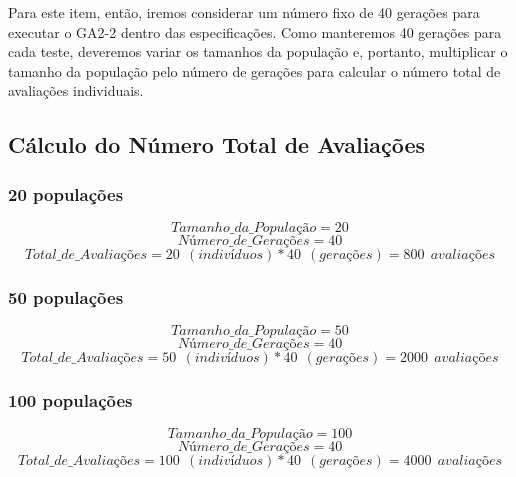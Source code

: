 \documentclass[a4paper, 12pt]{article}
\begin{document}
Para este item, então, iremos considerar um número fixo de 40 gerações para executar o GA2-2 dentro das especificações. Como manteremos 40 gerações para cada teste, deveremos variar os tamanhos da população e, portanto, multiplicar o tamanho da população pelo número de gerações para calcular o número total de avaliações individuais.\\

\subsection{Cálculo do Número Total de Avaliações
}

\subsubsection{20 populações}
\begin{equation*}
    Tamanho\_da\_População = 20
\end{equation*}
\begin{equation*}
    Número\_de\_Gerações = 40
\end{equation*}
\begin{equation*}
    Total\_de\_Avaliações = 20 \>\ (indivíduos) * 40 \>\ (gerações) = 800 \>\ avaliações
\end{equation*}

\subsubsection{50 populações}
\begin{equation*}
    Tamanho\_da\_População = 50
\end{equation*}
\begin{equation*}
    Número\_de\_Gerações = 40
\end{equation*}
\begin{equation*}
    Total\_de\_Avaliações = 50 \>\ (indivíduos) * 40 \>\ (gerações) = 2000 \>\ avaliações
\end{equation*}

\subsubsection{100 populações}
\begin{equation*}
    Tamanho\_da\_População = 100
\end{equation*}
\begin{equation*}
    Número\_de\_Gerações = 40
\end{equation*}
\begin{equation*}
    Total\_de\_Avaliações = 100 \>\ (indivíduos) * 40 \>\ (gerações) = 4000 \>\ avaliações
\end{equation*}
\end{document}
